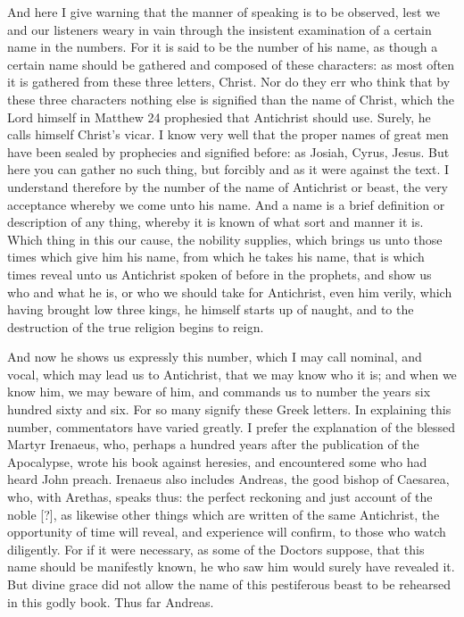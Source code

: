 And here I give warning that the manner of speaking is to be observed, lest we and our listeners weary in vain through the insistent examination of a certain name in the numbers. For it is said to be the number of his name, as though a certain name should be gathered and composed of these characters: as most often it is gathered from these three letters, Christ. Nor do they err who think that by these three characters nothing else is signified than the name of Christ, which the Lord himself in Matthew 24 prophesied that Antichrist should use. Surely, he calls himself Christ’s vicar. I know very well that the proper names of great men have been sealed by prophecies and signified before: as Josiah, Cyrus, Jesus. But here you can gather no such thing, but forcibly and as it were against the text. I understand therefore by the number of the name of Antichrist or beast, the very acceptance whereby we come unto his name. And a name is a brief definition or description of any thing, whereby it is known of what sort and manner it is. Which thing in this our cause, the nobility supplies, which brings us unto those times which give him his name, from which he takes his name, that is which times reveal unto us Antichrist spoken of before in the prophets, and show us who and what he is, or who we should take for Antichrist, even him verily, which having brought low three kings, he himself starts up of naught, and to the destruction of the true religion begins to reign.

And now he shows us expressly this number, which I may call nominal, and vocal, which may lead us to Antichrist, that we may know who it is; and when we know him, we may beware of him, and commands us to number the years six hundred sixty and six. For so many signify these Greek letters. In explaining this number, commentators have varied greatly. I prefer the explanation of the blessed Martyr Irenaeus, who, perhaps a hundred years after the publication of the Apocalypse, wrote his book against heresies, and encountered some who had heard John preach. Irenaeus also includes Andreas, the good bishop of Caesarea, who, with Arethas, speaks thus: the perfect reckoning and just account of the noble [?], as likewise other things which are written of the same Antichrist, the opportunity of time will reveal, and experience will confirm, to those who watch diligently. For if it were necessary, as some of the Doctors suppose, that this name should be manifestly known, he who saw him would surely have revealed it. But divine grace did not allow the name of this pestiferous beast to be rehearsed in this godly book. Thus far Andreas.

